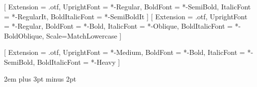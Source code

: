 \makeatletter
\usepackage{fontspec}
\setmainfont{XCharter}
\setsansfont{SourceSansPro}[
  Extension = .otf,
  UprightFont = *-Regular,
  BoldFont = *-SemiBold,
  ItalicFont = *-RegularIt,
  BoldItalicFont = *-SemiBoldIt
]
\setmonofont{FiraMono}[
  Extension = .otf,
  UprightFont = *-Regular,
  BoldFont = *-Bold,
  ItalicFont = *-Oblique,
  BoldItalicFont = *-BoldOblique,
  Scale=MatchLowercase
]

\usepackage{unicode-math}

\usepackage{xeCJK}
[
  Extension = .otf,
  UprightFont = *-Medium,
  BoldFont = *-Bold,
  ItalicFont = *-SemiBold,
  BoldItalicFont = *-Heavy
]

\newsavebox\verbatimbox
\edef\examplefilename{\jobname.example}
\newlength\exampleindent
\setlength\exampleindent{1em}

\newenvironment{example}
  {\VerbatimEnvironment
   \begin{VerbatimOut}{\examplefilename}}
  {\end{VerbatimOut}
   \typesetexample}

\newcommand\typesetexample{%
  \begin{trivlist}\item[]
  \vrule width .4pt\relax
  \hspace{.6em}%
  \@tempdima=\textwidth\relax
  \advance\@tempdima-.6em\relax
  \advance\@tempdima-.4pt\relax
  \begin{minipage}{\@tempdima}
    \BVerbatimInput[fontsize=\small]{\examplefilename}\par
    \vspace*{.8em}
    \hrule
    \vspace*{.8em}
    \examplefilename\relax
  \end{minipage}\par
  \end{trivlist}}

\usepackage{hologo}
\DeclareRobustCommand\xetex{\hologo{XeTeX}}
\DeclareRobustCommand\xelatex{\hologo{XeLaTeX}}
\DeclareRobustCommand\xetexspecimen{\hologo{XeTeX}-\lib{specimen}}
\DeclareRobustCommand\texlive{\TeX\ Live}
\def\lib{\textsf}
\def\file{\texttt}
\def\cs#1{\texttt{\textbackslash#1}}
\def\pkg{\textsf}
\renewcommand\contentsname{\textsc{目录 / Contents}}
\usepackage{indentfirst}
\parindent2em\relax
\parskip5pt plus 3pt minus 2pt\relax

\usepackage{xcolor}

